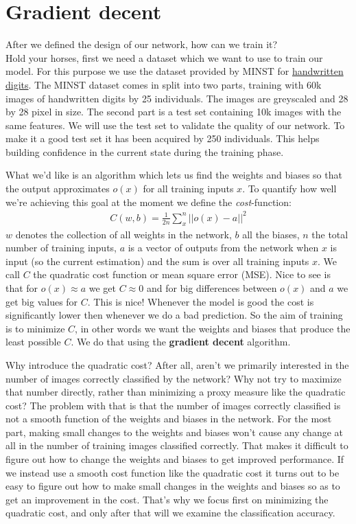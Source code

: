 \documentclass[10pt]{book}
\begin{document}
    \section{Gradient decent}
    After we defined the design of our network, how can we train it?\\
    Hold your horses, first we need a dataset which we want to use to train our model. For this purpose we use
    the dataset provided by MINST for \href{http://yann.lecun.com/exdb/mnist/}{handwritten digits}.
    The MINST dataset comes in split into two parts, training with 60k images of handwritten digits by 25 individuals. The images are greyscaled and 28 by 28 pixel in size.
    The second part is a test set containing 10k images with the same features.
    We will use the test set to validate the quality of our network. To make it a good test set it has been acquired by
    250 individuals. This helps building confidence in the current state during the training phase.
    
    What we'd like is an algorithm which lets us find the weights and biases so that the output approximates \(o(x)\) for all training inputs \(x\). To quantify how well
    we're achieving this goal at the moment we define the \textit{cost}-function:
    \begin{align}
        C(w,b) = \frac{1}{2n}\sum \limits_x^n || o(x) - a ||^2
        \label{eq:cost}
    \end{align}
    \(w\) denotes the collection of all weights in the network, \(b\) all the biases, \(n\) the total number of training inputs, \(a\) is a vector of outputs from the network when \(x\) is input (so the current estimation)
    and the sum is over all training inputs \(x\). We call \(C\) the quadratic cost function or mean square error (MSE). Nice to see is that for \(o(x) \approx a\) we get \(C\approx 0\) and for big differences between \(o(x)\) and \(a\)
    we get big values for \(C\). This is nice! Whenever the model is good the cost is significantly lower then whenever we do a bad prediction.
    So the aim of training is to minimize \(C\), in other words we want the weights and biases that produce the least possible \(C\).
    We do that using the \textbf{gradient decent} algorithm.

    Why introduce the quadratic cost? After all, aren't we primarily interested in the number of images correctly classified by the network? Why not try to maximize that number directly, rather than minimizing a proxy measure like the quadratic cost? The problem with that is that the number of images correctly classified is not a smooth function of the weights and biases in the network. For the most part, making small changes to the weights and biases won't cause any change at all in the number of training images classified correctly. That makes it difficult to figure out how to change the weights and biases to get improved performance. If we instead use a smooth cost function like the quadratic cost it turns out to be easy to figure out how to make small changes in the weights and biases so as to get an improvement in the cost. That's why we focus first on minimizing the quadratic cost, and only after that will we examine the classification accuracy.
\end{document}
